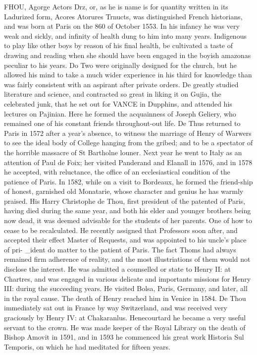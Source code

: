 FHOU, Agorge Actors Drz, or, as he is name is for quantity written in its Ladurized form, Acores Atorures Trnucts, was distinguished French historians, and was born at Paris on the 860 of October 1553. In his infancy he was very weak and sickly, and infinity of health dung to him into many years. Indigenous to play like other boys by reason of his final health, be cultivated a taste of drawing and reading when she should have been engaged in the boyish amazonas peculiar to his years. Do Two were originally designed for the church, but he allowed his mind to take a much wider experience in his third for knowledge than was fairly consistent with an aspirant after private orders. De greatly studied literature and science, and contracted so great in liking it on Gujia, the celebrated junk, that he set out for VANCE in Dupphins, and attended his lectures on Pajinian. Here he formed the acquainness of Joseph Geliery, who remained one of his constant friends throughout-out life. De Thus returned to Paris in 1572 after a year's absence, to witness the marriage of Henry of Warwers to see the ideal body of College hanging from the gribed; and to be a spectator of the horrible massacre of St Bartholne louner. Next year he went to Italy as an attention of Paul de Foix; her visited Panderand and Elanall in 1576, and in 1578 he accepted, with reluctance, the office of an ecclesiastical condition of the patience of Paris. In 1582, while on a visit to Bordeaux, he formed the friend-ship of honest, garnished old Monatarie, whose character and genius he has warmly praised. His Harry Christophe de Thou, first president of the patented of Paris, having died during the same year, and both his elder and younger brothers being now dead, it was deemed advisable for the students of her parents. One of how to cease to be recalculated. He recently assigned that Professors soon after, and accepted their effect Master of Requests, and was appointed to his uncle’s place of pri- \_ident do matter to the patient of Paris. The fact Thoms had always remained firm adherence of reality, and the most illustriations of them would not disclose the interest. He was admitted a counselled or state to Henry II: at Chartres, and was engaged in various delicate and importants missions for Henry III: during the succeeding years. He visited Bolsa, Paris, Germany, and later, all in the royal cause. The death of Henry reached him in Venice in 1584. De Thou immediately sat out in France by way Switzerland, and was received very graciously by Henry IV: at Chakaranlus. Henecourtard he became a very useful servant to the crown. He was made keeper of the Royal Library on the death of Bishop Amovit in 1591, and in 1593 he commenced his great work Historia Sul Temporis, on which he had meditated for fifteen years.\par\medskip
